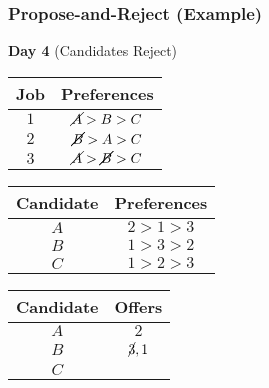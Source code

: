 \documentclass{beamer}
\begin{document}
\begin{frame}
    \frametitle{Propose-and-Reject (Example)}
    {\bf Day 4} (Candidates Reject)
    \begin{center}
        \begin{tabular}{c|c}
            Job & Preferences \\
            \hline
            $1$ & $\cancel{A}>B>C$\\
            $2$ & $\cancel{B}>A>C$\\
            $3$ & $\cancel{A}>\cancel{B}>C$
        \end{tabular}
        \hspace{10pt}
        \begin{tabular}{c|c}
            Candidate & Preferences \\
            \hline
            $A$ & $2>1>3$\\
            $B$ & $1>3>2$\\
            $C$ & $1>2>3$
        \end{tabular}
    \end{center}
    \begin{center}
        \begin{tabular}{c|c}
            Candidate & Offers \\
            \hline
            $A$ & $2$ \\
            $B$ & $\cancel{3},1$ \\
            $C$ & 
        \end{tabular}
    \end{center}
\end{frame}
\end{document}
